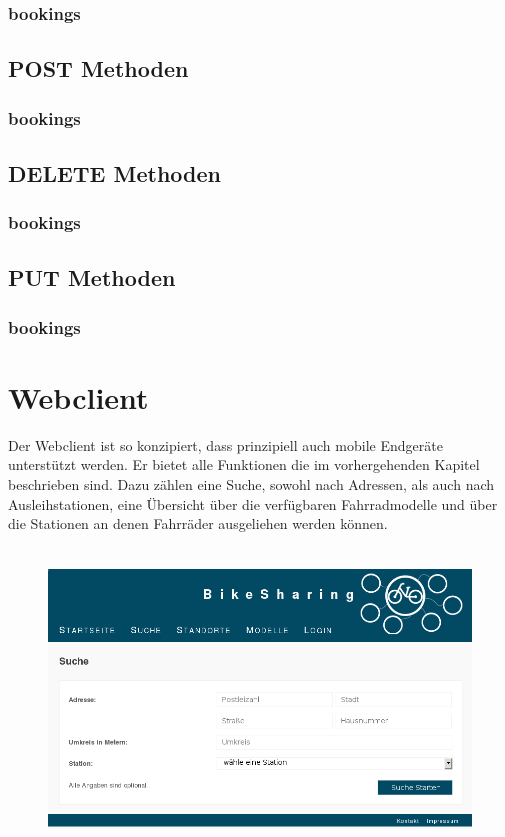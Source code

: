 \subsection{bookings}

\section{POST Methoden}
\subsection{bookings}

\section{DELETE Methoden}
\subsection{bookings}

\section{PUT Methoden}
\subsection{bookings}


\chapter{Webclient}

Der Webclient ist so konzipiert, dass prinzipiell auch mobile Endgeräte unterstützt werden.
Er bietet alle Funktionen die im vorhergehenden Kapitel beschrieben sind.
Dazu zählen eine Suche, sowohl nach Adressen, als auch nach Ausleihstationen, eine Übersicht über die verfügbaren Fahrradmodelle und über die Stationen an denen Fahrräder ausgeliehen werden können.

\begin{figure}[h]
        \centering
	\includegraphics[height=80mm]{pics/bikesharing_search.png}
\end{figure}

